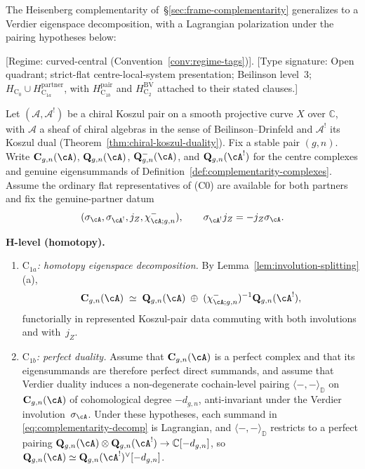 The Heisenberg complementarity
of~\S\ref{sec:frame-complementarity} generalizes to a Verdier
eigenspace decomposition, with a Lagrangian polarization under the
pairing hypotheses below:

\begin{theorem}
\label{thm:quantum-complementarity-main}
\label{thm:quantum-complementarity}
\textup{[}Regime: curved-central
\textup{(}Convention~\textup{\ref{conv:regime-tags})].}
\textup{[}Type signature: Open quadrant; strict-flat
centre-local-system presentation; Beilinson level~3;
\(H_{\mathrm C_0}\cup H_{\mathrm C_{1a}}^{\mathrm{partner}}\),
with \(H_{\mathrm C_{1b}}^{\mathrm{pair}}\) and
\(H_{\mathrm C_2}^{\mathrm{BV}}\) attached to their stated clauses.\textup{]}

Let $(\mathcal{A}, \mathcal{A}^!)$ be a chiral Koszul pair on a smooth projective
curve $X$ over $\mathbb{C}$, with $\mathcal{A}$ a sheaf of chiral algebras in
the sense of Beilinson--Drinfeld \cite[Chapter 3]{BD04} and $\mathcal{A}^!$
its Koszul dual (Theorem~\ref{thm:chiral-koszul-duality}).
Fix a stable pair \((g,n)\).  Write
$\mathbf{C}_{g,n}(\cA)$, $\mathbf{Q}_{g,n}(\cA)$,
$\mathbf{Q}_{g,n}^{-}(\cA)$, and $\mathbf{Q}_{g,n}(\cA^!)$
for the centre complexes and genuine eigensummands of
Definition~\textup{\ref{def:complementarity-complexes}}.  Assume the
ordinary flat representatives of \textup{(C0)} are available for both
partners and fix the genuine-partner datum
\[
 (\sigma_{\cA},\sigma_{\cA^!},j_Z,\chi^-_{\cA;g,n}),
 \qquad
 \sigma_{\cA^!}j_Z=-j_Z\sigma_{\cA}.
\]

\smallskip\noindent
\textbf{H-level \textup{(}homotopy\textup{)}.}
\begin{enumerate}[label=\textup{(\roman*)}]
\item \emph{\(\mathrm{C}_{1a}\): homotopy eigenspace decomposition.}
 By Lemma~\textup{\ref{lem:involution-splitting}(a)},
 \begin{equation}\label{eq:complementarity-decomp}
 \mathbf{C}_{g,n}(\cA) \;\simeq\;
 \mathbf{Q}_{g,n}(\cA) \;\oplus\;
 (\chi^-_{\cA;g,n})^{-1}\mathbf{Q}_{g,n}(\cA^!),
 \end{equation}
 functorially in represented Koszul-pair data commuting with both
 involutions and with~\(j_Z\).

\item \emph{\(\mathrm{C}_{1b}\): perfect duality.}
 Assume that $\mathbf{C}_{g,n}(\cA)$ is a perfect
 complex and that its eigensummands are therefore perfect direct
 summands, and assume that Verdier duality induces a
 non-degenerate cochain-level pairing
 $\langle -,- \rangle_{\mathbb{D}}$ on~$\mathbf{C}_{g,n}(\cA)$
 of cohomological degree $-d_{g,n}$, anti-invariant under the
 Verdier involution~$\sigma_{\cA}$. Under these hypotheses, each summand in
 \eqref{eq:complementarity-decomp} is Lagrangian, and
 $\langle -, - \rangle_{\mathbb{D}}$ restricts to a
 perfect pairing
 $\mathbf{Q}_{g,n}(\cA) \otimes \mathbf{Q}_{g,n}(\cA^!)
 \to \mathbb{C}[-d_{g,n}]$,
 so $\mathbf{Q}_{g,n}(\cA) \simeq
 \mathbf{Q}_{g,n}(\cA^!)^\vee[-d_{g,n}]$.


\end{enumerate}
\end{theorem}
